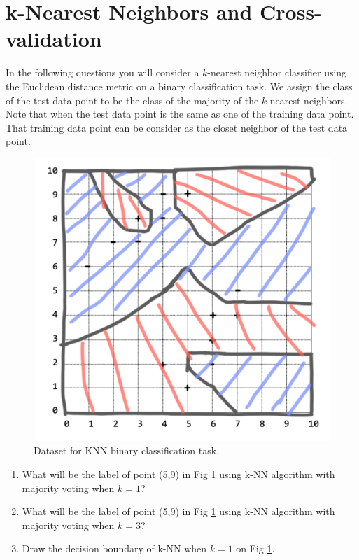 \section{k-Nearest Neighbors and Cross-validation }
In the following questions you will consider a $k$-nearest neighbor classifier using the Euclidean distance metric on a binary classification task. We assign the class of the test data point to be the class of the majority of the $k$ nearest neighbors. Note that when the test data point is the same as one of the training data point. That training data point can be consider as the closet neighbor of the test data point. 

\begin{figure}[h]
    \centering
    \includegraphics[scale=0.5]{knn-db.png}
    \caption{Dataset for KNN binary classification task.}
    \label{fig:knn}
\end{figure}

\begin{enumerate}
 \item {} 
        What will be the label of point (5,9) in Fig \ref{fig:knn} using k-NN algorithm with majority voting when $k=1$?

    \item {} 
        What will be the label of point (5,9) in Fig \ref{fig:knn} using k-NN algorithm with majority voting when $k=3$?
    
    \item {}
        Draw the decision boundary of k-NN when $k=1$ on Fig \ref{fig:knn}.

\end{enumerate}
